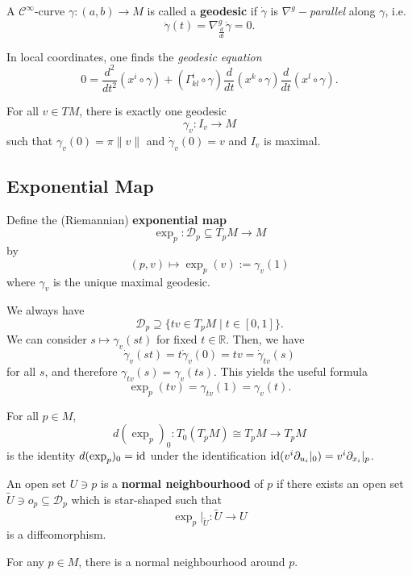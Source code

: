 \begin{definition}[Geodesic]
    A $\mathcal{C}^\infty$-curve $\gamma: (a,b) \to M$ is called a \textbf{geodesic} if $\dot{\gamma}$ is $\nabla^g-$\emph{parallel} along $\gamma$, i.e. \[
        \ddot{\gamma}(t)= \nabla^g_{\frac{d}{dt}} \dot{\gamma}=0
    .\]
\end{definition}
In local coordinates, one finds the \emph{geodesic equation}
\[
    0 = \frac{d^2}{dt^2} (x^i \circ \gamma) + (\Gamma_{kl}^i \circ \gamma) \frac{d}{dt}(x^k \circ \gamma) \frac{d}{dt} (x^l \circ \gamma)
.\] 
\begin{theorem}
    For all $v \in TM$, there is exactly one geodesic \[
    \gamma_v: I_v \to M
\] such that $\gamma_v(0)=\pi \|v\|$ and $\dot{\gamma}_v (0)=v$ and $I_v$ is maximal.
\end{theorem}
\subsection*{Exponential Map}
\begin{definition}
    Define the (Riemannian) \textbf{exponential map}
    \[
    \exp_p: \mathcal{D}_p \subseteq T_pM \to M
    \] by
    \[
        (p,v) \mapsto \exp_p(v) := \gamma_v(1)
    \] where $\gamma_v$ is the unique maximal geodesic.
\end{definition}
We always have \[
    \mathcal{D}_p \supseteq \{tv \in T_pM \mid t \in [0,1]\} 
.\] 
We can consider $s \mapsto \gamma_v(st)$ for fixed $t \in \mathbb{R}$. Then, we have \[
    \dot{\gamma}_v(st)=t\dot{\gamma}_v(0)=tv=\dot{\gamma}_{tv}(s)
\] for all $s$, and therefore $\gamma_{tv}(s)=\gamma_v(ts)$. This yields the useful formula \[
\exp_p(tv)=\gamma_{tv}(1)=\gamma_v(t)
.\] 
\begin{lemma}
    For all $p \in M$, \[
    d(\exp_p)_0: T_0(T_pM) \cong T_pM \to T_pM
\] is the identity $d(\exp_p)_0 = \operatorname{id}$ under the identification $\operatorname{id}(v^i \partial_{u_i}|_0)=v^i \partial_{x_i}|_p$.
\end{lemma}
\begin{definition}
    An open set $U \ni p$ is a \textbf{normal neighbourhood}  of $p$ if there exists an open set $\tilde{U} \ni o_p \subseteq \mathcal{D}_p$ which is star-shaped such that \[
        \exp_p|_{\tilde{U}}: \tilde{U} \to U
    \] is a diffeomorphism.
\end{definition}
\begin{theorem}
    For any $p \in M$, there is a normal neighbourhood around $p$. 
\end{theorem}
